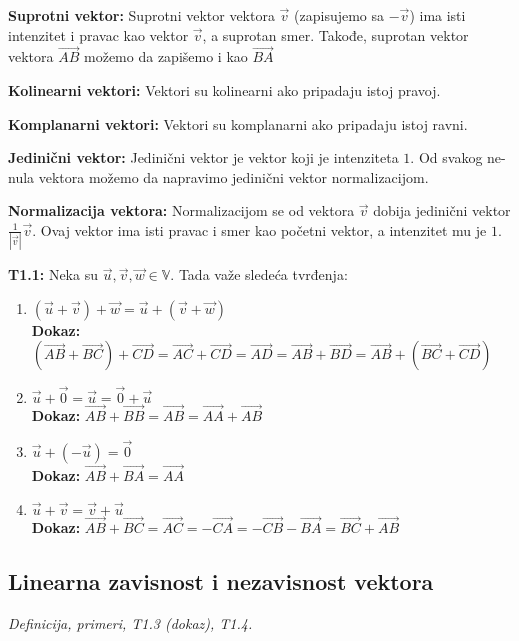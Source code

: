 \documentclass[12pt]{article}
\newcommand{\vek}[1]{\overrightarrow{#1}}
\begin{document}
\textbf{Suprotni vektor:} Suprotni vektor vektora $\vek{v}$ (zapisujemo sa
$-\vek{v}$) ima isti intenzitet i pravac kao vektor $\vek{v}$, a suprotan smer.
Takođe, suprotan vektor vektora $\vek{AB}$ možemo da zapišemo i kao $\vek{BA}$
\par

\textbf{Kolinearni vektori:} Vektori su kolinearni ako pripadaju istoj pravoj.
\par

\textbf{Komplanarni vektori:} Vektori su komplanarni ako pripadaju istoj ravni.
\par

\textbf{Jedinični vektor:} Jedinični vektor je vektor koji je intenziteta $1$.
Od svakog ne-nula vektora možemo da napravimo jedinični vektor normalizacijom.
\par

\textbf{Normalizacija vektora:} Normalizacijom se od vektora $\vek{v}$ dobija
jedinični vektor $\frac{1}{|\vek{v}|}\vek{v}$. Ovaj vektor ima isti pravac
i smer kao početni vektor, a intenzitet mu je $1$.
\par

\textbf{T1.1:} Neka su $\vek{u}, \vek{v}, \vek{w}\in\mathbb{V}$. Tada važe
sledeća tvrđenja:
\begin{enumerate}[label=\textbf{(S\arabic*)}]
    \item $(\vek{u}+\vek{v})+\vek{w}=\vek{u}+(\vek{v}+\vek{w})$\\
          \textbf{Dokaz:}
          $(\vek{AB}+\vek{BC})+\vek{CD}=\vek{AC}+\vek{CD}=\vek{AD}=\vek{AB}+\vek{BD}
              =\vek{AB}+(\vek{BC}+\vek{CD})$
    \item
          $\vek{u}+\vek{0}=\vek{u}=\vek{0}+\vek{u}$\\
          \textbf{Dokaz:}
          $\vek{AB}+\vek{BB}=\vek{AB}=\vek{AA}+\vek{AB}$
    \item $\vek{u}+(-\vek{u})=\vek{0}$\\
          \textbf{Dokaz:}
          $\vek{AB}+\vek{BA}=\vek{AA}$
    \item $\vek{u}+\vek{v}=\vek{v}+\vek{u}$\\
          \textbf{Dokaz:}
          $\vek{AB}+\vek{BC}=\vek{AC}=-\vek{CA}=-\vek{CB}-\vek{BA}=\vek{BC}+\vek{AB}$
\end{enumerate}

\subsection{Linearna zavisnost i nezavisnost vektora}
\textit{Definicija, primeri, T1.3 (dokaz), T1.4.}
\par
\vspace*{1cm}
\end{document}

